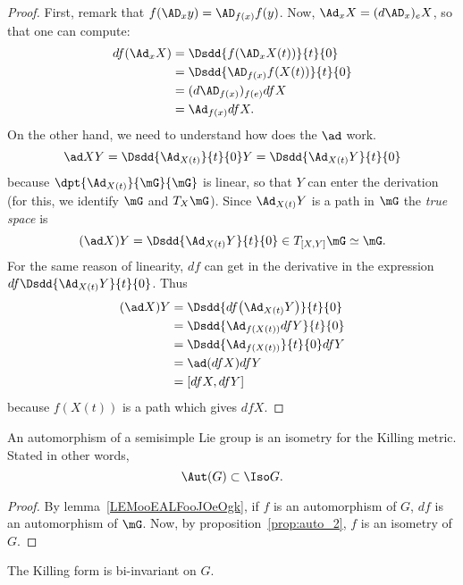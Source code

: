 \begin{proof}
First, remark that $f(\AD_xy)=\AD_{f(x)}f(y)$. Now, $\Ad_x X=(d\AD_x)_eX$, so that one can compute:
\begin{equation}
\begin{split}
   df(\Ad_xX)&=\Dsdd{f(\AD_xX(t))}{t}{0}\\
             &=\Dsdd{   \AD_{f(x)}f(X(t))  }{t}{0}\\
	     &=(d\AD_{f(x)})_{f(e)}df X\\
	     &=\Ad_{f(x)}df X.
\end{split}
\end{equation}
On the other hand, we need to understand how does the $\ad$ work.
\[
  \ad XY=\Dsdd{\Ad_{X(t)}}{t}{0}Y=\Dsdd{\Ad_{X(t)}Y}{t}{0}
\]
because $\dpt{\Ad_{X(t)}}{\mG}{\mG}$ is linear, so that $Y$ can enter the derivation (for this, we identify $\mG$ and $T_X\mG$). Since $\Ad_{X(t)}Y$ is a path in $\mG$ the \emph{true space} is
\[
(\ad X)Y=\Dsdd{ \Ad_{X(t)}Y }{t}{0}\in T_{[X,Y]}\mG\simeq\mG.
\]
For the same reason of linearity, $df$ can get in the derivative in the expression $df\Dsdd{  \Ad_{X(t)}Y  }{t}{0}$. Thus
\begin{equation}
\begin{split}
(\ad X)Y&=\Dsdd{  df\big(\Ad_{X(t)}Y\big)  }{t}{0}\\
        &=\Dsdd{  \Ad_{ f(X(t)) }df Y  }{t}{0}\\
	&=\Dsdd{ \Ad_{f(X(t))} }{t}{0}df Y\\
	&=\ad(dfX)df Y\\
	&=[dfX,df Y]
\end{split}
\end{equation}
because $f(X(t))$ is a path which gives $df X$.
\end{proof}

\begin{corollary}
An automorphism of a semisimple Lie group is an isometry for the Killing metric. Stated in other words,
    \begin{equation}\label{eq:Aut_Iso}
        \Aut(G)\subset\Iso G.
    \end{equation}
\end{corollary}

\begin{proof}
    By lemma~\ref{LEMooEALFooJOeOgk}, if $f$ is an automorphism of $G$, $df$ is an automorphism of $\mG$. Now, by proposition~\ref{prop:auto_2}, $f$ is an isometry of $G$.
\end{proof}

\begin{theorem}
The Killing form is bi-invariant on $G$.
\label{tho:bi_invariance}
\end{theorem}

